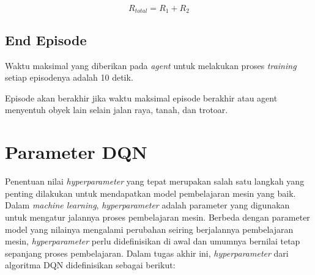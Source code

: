 \begin{equation}
	R_{total} = R_1+R_2
	\label{eq:rtot_nobundaran}
\end{equation}

\subsection{End Episode}
\label{sec:end_episode}
Waktu maksimal yang diberikan pada \textit{agent} untuk melakukan proses \textit{training} setiap episodenya adalah 10 detik.

Episode akan berakhir jika waktu maksimal episode berakhir atau agent menyentuh obyek lain selain jalan raya, tanah, dan trotoar.

\section{Parameter DQN}
\label{sec:parameter_dqn}
Penentuan nilai \textit{hyperparameter} yang tepat merupakan salah satu langkah yang penting dilakukan untuk mendapatkan model pembelajaran mesin yang baik. Dalam \textit{machine learning}, \textit{hyperparameter} adalah parameter yang digunakan untuk mengatur jalannya proses pembelajaran mesin. Berbeda dengan parameter model yang nilainya mengalami perubahan seiring berjalannya pembelajaran mesin, \textit{hyperparameter} perlu didefinisikan di awal dan umumnya bernilai tetap sepanjang proses pembelajaran. Dalam tugas akhir ini, \textit{hyperparameter} dari algoritma DQN didefinisikan sebagai berikut:

